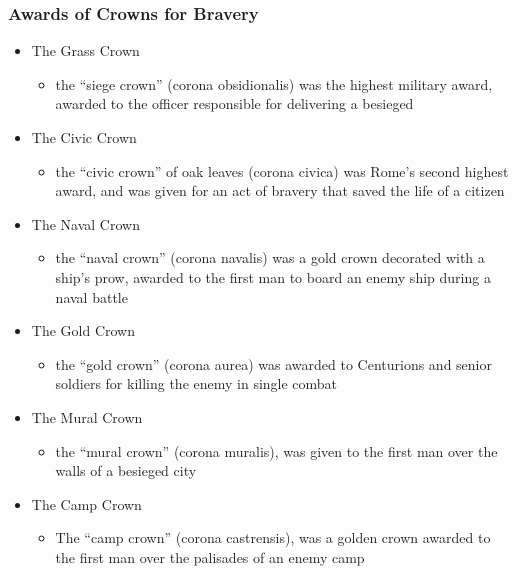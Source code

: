 \documentclass[12pt, twoside]{article}
\begin{document}
\subsubsection{Awards of Crowns for Bravery}
\begin{itemize}
\item The Grass Crown 
	\begin{itemize}
	\item the “siege crown” (corona obsidionalis) was the highest military award, awarded to the officer responsible for delivering a besieged
	\end{itemize}
\item The Civic Crown
	\begin{itemize}
	\item the “civic crown” of oak leaves (corona civica) was Rome’s second highest award, and was given for an act of bravery that saved the life of a citizen
	\end{itemize}
\item The Naval Crown
	\begin{itemize}
	\item the “naval crown” (corona navalis) was a gold crown decorated with a ship’s prow, awarded to the first man to board an enemy ship during a naval battle
	\end{itemize}
\item The Gold Crown 
	\begin{itemize}
	\item the “gold crown” (corona aurea) was awarded to Centurions and senior soldiers for killing the enemy in single combat 
	\end{itemize}
\item The Mural Crown
	\begin{itemize}
	\item the “mural crown” (corona muralis), was given to the first man over the walls of a besieged city
	\end{itemize}
\item The Camp Crown
	\begin{itemize}
	\item The “camp crown” (corona castrensis), was a golden crown awarded to the first man over the palisades of an enemy camp
	\end{itemize}
\end{itemize}
\end{document}
